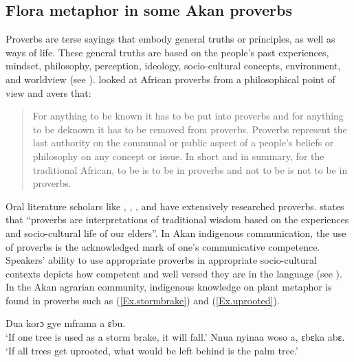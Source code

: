 \documentclass[output=paper,colorlinks,citecolor=brown]{langscibook}
\begin{document}
\subsection{Flora metaphor in some Akan proverbs}

Proverbs are terse sayings that embody general truths or principles, as well as ways of life. These general truths are based on the people’s past experiences, mindset, philosophy, perception, ideology, socio-cultural concepts, environment, and worldview (see \cite[11]{Agyekum2012}). \citet[362]{Momoh2000} looked at African proverbs from a philosophical point of view and avers that:

\begin{quote}
For anything to be known it has to be put into proverbs and for anything to be deknown it has to be removed from proverbs. Proverbs represent the last authority on the communal or public aspect of a people’s beliefs or philosophy on any concept or issue. In short and in summary, for the traditional African, to be is to be in proverbs and not to be is not to be in proverbs.    
\end{quote}

\begin{sloppypar}
Oral literature scholars like \citet{Agyekum2005}, \citet{Finnegan2012}, \citet{Okpewho1992}, and \citet{Yankah1989a} have extensively researched proverbs. \citet[9]{Agyekum2005} states that ``proverbs are interpretations of traditional wisdom based on the experiences and socio-cultural life of our elders''. In Akan indigenous communication, the use of proverbs is the acknowledged mark of one’s communicative competence. Speakers' ability to use appropriate proverbs in appropriate socio-cultural contexts depicts how competent and well versed they are in the language (see  \citealt{Agyekum2012, Finnegan2012, Yankah1989a}). In the Akan agrarian community, indigenous knowledge on plant metaphor is found in proverbs such as (\ref{Ex.stormbrake}) and (\ref{Ex.uprooted}).
\end{sloppypar}

\ea \label{Ex.stormbrake}
\gl Dua korɔ gye mframa a ɛbu.\\
\glt  ‘If one tree is used as a storm brake, it will fall.'
\ex \label{Ex.uprooted}
\gl Nnua nyinaa woso a, ɛbɛka abɛ.\\
\glt  ‘If all trees get uprooted, what would be left behind is the palm tree.'
\z
\end{document}
